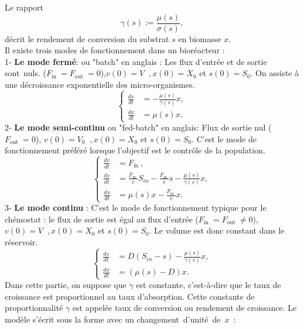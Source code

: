 \documentclass[12pt,a4paper]{report}%
\begin{document}
Le rapport
$$
\gamma(s):=\frac{\mu(s)}{\sigma(s)},
$$
décrit le rendement de conversion du substrat $s$ en biomasse $x$.\\
Il existe trois modes de fonctionnement dans un bioréacteur :\\
1- {\bf Le mode fermé}: ou "batch" en anglais : Les flux d'entrée et de sortie sont nuls. ($F_{\text {in }}=F_{\text {out }}=0$),$ v(0)= V \;\; ,x(0) = X_0$ et $s(0) = S_0$. On assiste à une décroissance exponentielle des micro-organismes.\\
\begin{equation}
\left\{\begin{aligned}
\frac{d s}{d t} & = -\frac{\mu(s)}{\gamma(s)} x, \\
\frac{d x}{d t} & =\mu(s) x  .
\end{aligned}\right.
\end{equation}
2- {\bf Le mode semi-continu } ou "fed-batch" en anglais: Flux de sortie nul ($F_{\text {out }}=0$), $ v(0)= V_0 \;\; ,x(0) = X_0$ et $s(0) = S_0$. C'est le mode de fonctionnement préféré lorsque l'objectif est le contrôle de la population.\\
\begin{equation}
\left\{\begin{aligned}
\frac{d v}{d t} & =F_{\text {in }}, \\
\frac{d s}{d t} & =\frac{F_{\text {in }}}{v} S_{in}-\frac{F_{\text {in }}}{v} s -\frac{\mu(s)}{\gamma(s)} x, \\
\frac{d x}{d t} & =\mu(s) x -\frac{F_{\text {in }}}{v} x .
\end{aligned}\right.
\end{equation}
3- {\bf Le mode continu }: C'est le mode de fonctionnement typique pour le chémostat : le flux de sortie est égal au flux d'entrée ($F_{\text {in }}=F_{\text {out }}\neq 0$), \;$ v(0)= V \;\; ,x(0) = X_0$ et $s(0) = S_0$. Le volume est donc constant dans le réservoir.
\begin{equation}
\left\{\begin{aligned}
\frac{d s}{d t} & =D\left(  S_{in}- s\right) -\frac{\mu(s)}{\gamma(s)} x, \\
\frac{d x}{d t} & =\left( \mu(s)  -D\right) x .
\end{aligned}\right.
\end{equation}
Dans cette partie, on suppose que $\gamma$ est constante, c’est-à-dire que le taux de croissance est proportionnel au taux d’absorption. Cette constante de proportionnalité $\gamma$ est appelée taux de conversion ou rendement de croissance. Le modèle s’écrit sous la forme avec un changement d’unité de $x$ :
\end{document}
